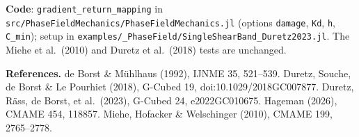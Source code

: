 \documentclass[10pt,a4paper]{article}
\begin{document}
\textbf{Code}: \texttt{gradient\_return\_mapping} in \texttt{src/PhaseFieldMechanics/PhaseFieldMechanics.jl}
(options \texttt{damage}, \texttt{Kd}, \texttt{h}, \texttt{C\_min}); setup in
\texttt{examples/\_PhaseField/SingleShearBand\_Duretz2023.jl}. The Miehe et al.\ (2010) and Duretz et al.\ (2018)
tests are unchanged.

\vspace{-0.1cm}
{\footnotesize
\textbf{References.} de Borst \& M\"uhlhaus (1992), IJNME 35, 521--539.
Duretz, Souche, de Borst \& Le Pourhiet (2018), G-Cubed 19, doi:10.1029/2018GC007877.
Duretz, R\"ass, de Borst, et al.\ (2023), G-Cubed 24, e2022GC010675.
Hageman (2026), CMAME 454, 118857.
Miehe, Hofacker \& Welschinger (2010), CMAME 199, 2765--2778.\par}
\end{document}
